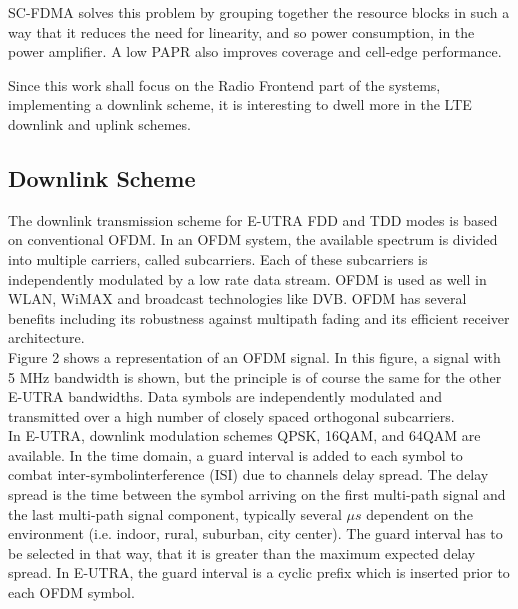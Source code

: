 SC-FDMA solves this problem by grouping together the resource blocks in such a
way that it reduces the need for linearity, and so power consumption, in the
power amplifier. A low PAPR also improves coverage and cell-edge performance.

Since this work shall focus on the Radio Frontend part of the systems, implementing
a downlink scheme, it is interesting to dwell more in the LTE downlink and uplink
schemes.

\subsection{Downlink Scheme}

The downlink transmission scheme for E-UTRA FDD and TDD modes is based on
conventional OFDM. In an OFDM system, the available spectrum is divided into
multiple carriers, called subcarriers. Each of these subcarriers is independently
modulated by a low rate data stream. OFDM is used as well in WLAN, WiMAX and
broadcast technologies like DVB. OFDM has several benefits including its robustness
against multipath fading and its efficient receiver architecture.\\

Figure 2 shows a representation of an OFDM signal. In this figure, a signal with
5 MHz bandwidth is shown, but the principle is of course the same for the other
E-UTRA bandwidths. Data symbols are independently modulated and
transmitted over a high number of closely spaced orthogonal subcarriers.\\

In E-UTRA, downlink modulation schemes QPSK, 16QAM, and 64QAM are available.
In the time domain, a guard interval is added to each symbol to combat
inter-symbolinterference (ISI) due to channels delay spread. The delay spread is
the time between the symbol arriving on the first multi-path signal and the last
multi-path signal component, typically several $\mu s$ dependent on the environment
(i.e. indoor, rural, suburban, city center). The guard interval has to be selected
in that way, that it is greater than the maximum expected delay spread. In E-UTRA,
the guard interval is a cyclic prefix which is inserted prior to each OFDM symbol.


